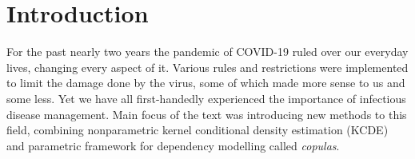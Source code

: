 \documentclass[12pt,a4paper]{article}
\begin{document}
    \section{Introduction}
    For the past nearly two years the pandemic of COVID-19 ruled over our everyday lives, changing every aspect of it. Various rules and restrictions were implemented to 
    limit the damage done by the virus, some of which made more sense to us and some less. Yet we have all first-handedly experienced the importance of infectious disease management.
    Main focus of the text was introducing new methods to this field, combining nonparametric kernel conditional density estimation (KCDE) and parametric framework for dependency modelling
    called \textit{copulas}. 
\end{document}
